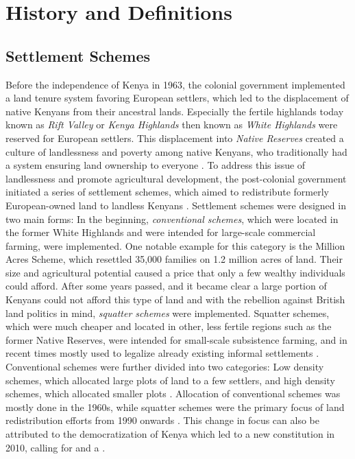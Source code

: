 \section{History and Definitions}
\label{sec:background}
\subsection{Settlement Schemes}
Before the independence of Kenya in 1963, the colonial government implemented a land tenure system favoring European settlers, which led to the displacement of native Kenyans from their ancestral lands.
Especially the fertile highlands today known as \textit{Rift Valley} or \textit{Kenya Highlands} then known as \textit{White Highlands} were reserved for European settlers.
This displacement into \textit{Native Reserves} created a culture of landlessness and poverty among native Kenyans, who traditionally had a system ensuring land ownership to everyone \parencite{leoLandClassKenya1984}.
To address this issue of landlessness and promote agricultural development, the post-colonial government initiated a series of settlement schemes, which aimed to redistribute formerly European-owned land to landless Kenyans \parencite{lukaloExploringStatusSettlement2016}.
Settlement schemes were designed in two main forms: In the beginning, \textit{conventional schemes}, which were located in the former White Highlands and were intended for large-scale commercial farming, were implemented.
One notable example for this category is the Million Acres Scheme, which resettled 35,000 families on 1.2 million acres of land.
Their size and agricultural potential caused a price that only a few wealthy individuals could afford.
After some years passed, and it became clear a large portion of Kenyans could not afford this type of land and with the rebellion against British land politics in mind, \textit{squatter schemes} were implemented.
Squatter schemes, which were much cheaper and located in other, less fertile regions such as the former Native Reserves, were intended for small-scale subsistence farming, and in recent times mostly used to legalize already existing informal settlements \parencite{leoLandClassKenya1984}.
Conventional schemes were further divided into two categories: Low density schemes, which allocated large plots of land to a few settlers, and high density schemes, which allocated smaller plots \parencite{lukaloExploringStatusSettlement2016}.
Allocation of conventional schemes was mostly done in the 1960s, while squatter schemes were the primary focus of land redistribution efforts from 1990 onwards \parencite{lukaloExploringStatusSettlement2016}.
This change in focus can also be attributed to the democratization of Kenya which led to a new constitution in 2010, calling for  and a  \parencite{constitution}.


